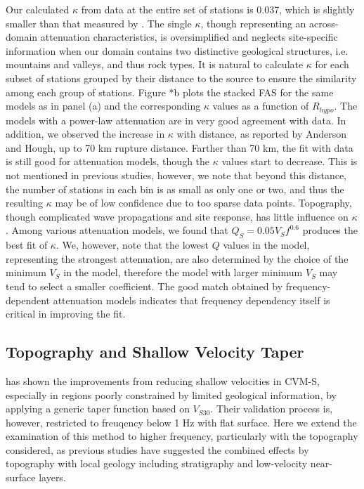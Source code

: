 Our calculated $\kappa$ from data at the entire set of stations is 0.037, which is slightly smaller than that measured by \citet{anderson1984model}. The single $\kappa$, though representing an across-domain attenuation characteristics, is oversimplified and neglects site-specific information when our domain contains two distinctive geological structures, i.e. mountains and valleys, and thus rock types. It is natural to calculate $\kappa$ for each subset of stations grouped by their distance to the source to ensure the similarity among each group of stations. Figure *b plots the stacked FAS for the same models as in panel (a) and the corresponding $\kappa$ values as a function of $R_{hypo}$. The models with a power-law attenuation are in very good agreement with data. In addition, we observed the increase in $\kappa$ with distance, as reported by Anderson and Hough, up to 70 km rupture distance. Farther than 70 km, the fit with data is still good for attenuation models, though the $\kappa$ values start to decrease. This is not mentioned in previous studies, however, we note that beyond this distance, the number of stations in each bin is as small as only one or two, and thus the resulting $\kappa$ may be of low confidence due to too sparse data points. Topography, though complicated wave propagations and site response, has little influence on $\kappa$. Among various attenuation models, we found that $Q_S=0.05V_Sf^{0.6}$ produces the best fit of $\kappa$. We, however, note that the lowest $Q$ values in the model, representing the strongest attenuation, are also determined by the choice of the minimum $V_S$ in the model, therefore the model with larger minimum $V_S$ may tend to select a smaller coefficient. The good match obtained by frequency-dependent attenuation models indicates that frequency dependency itself is critical in improving the fit.

\subsection{Topography and Shallow Velocity Taper}
\citet{huCalibrationNearsurfaceSeismic2021} has shown the improvements from reducing shallow velocities in CVM-S, especially in regions poorly constrained by limited geological information, by applying a generic taper function based on $V_{S30}$.
Their validation process is, however, restricted to freuqency below 1 Hz with flat surface. Here we extend the examination of this method to higher frequency, particularly with the topography considered, as previous studies have suggested the combined effects by topography with local geology including stratigraphy and low-velocity near-surface layers.

